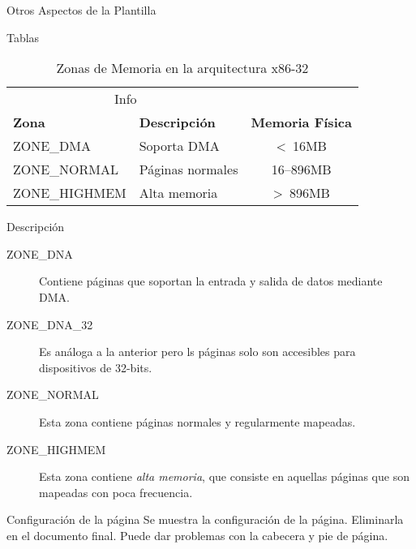 \documentclass{article}
\theoremstyle{theorem-style}  %
\theoremstyle{definition}
\theoremstyle{example-style}
\begin{document}
\begin{section}{Otros Aspectos de la Plantilla}

\begin{subsection}{Tablas}

\lipsum[1]

\begin{table}[ht]
\caption{Zonas de Memoria en la arquitectura x86-32}
\kern 1mm                                  %
\centering \begin{tabular}{@{}llc@{}}
\toprule
\multicolumn{2}{c}{Info}                                            \\
\cmidrule(r){1-2}
\textbf{Zona} & \textbf{Descripción}   & \textbf{Memoria Física}    \\ 
\midrule
ZONE\_DMA     & Soporta DMA            & \textless \ 16MB           \\ 
ZONE\_NORMAL  & Páginas normales       & 16–896MB                   \\
ZONE\_HIGHMEM & Alta memoria           & \textgreater \ 896MB       \\ 
\bottomrule
\end{tabular}
\label{table:memoria-x86-32}
\end{table}

\end{subsection}

\begin{subsection}{Descripción}

\begin{description}
\item[ZONE\_DNA] Contiene páginas que soportan la entrada y salida de datos mediante DMA.
\item[ZONE\_DNA\_32] Es análoga a la anterior pero ls páginas solo son accesibles para
dispositivos de 32-bits.
\item[ZONE\_NORMAL] Esta zona contiene páginas normales y regularmente mapeadas.
\item[ZONE\_HIGHMEM] Esta zona contiene \textit{alta memoria}, que consiste en
 aquellas páginas que son mapeadas con poca frecuencia.
\end{description}

\end{subsection}

\pagebreak

\begin{subsection}{Configuración de la página}
Se muestra la configuración de la página. Eliminarla en el documento final. 
Puede dar problemas con la cabecera y pie de página.

\centering\layout
\end{subsection}

\end{section}
\end{document}
